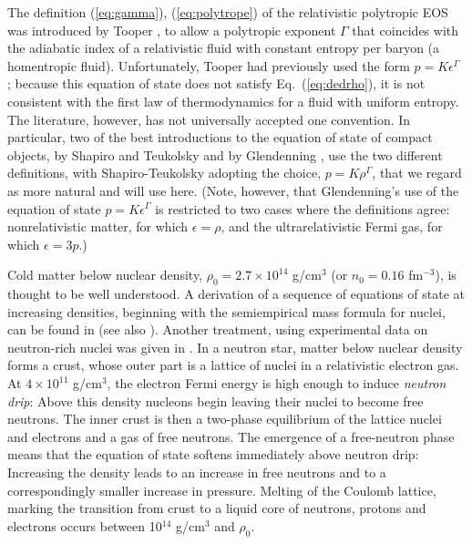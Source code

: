 \documentclass[12pt]{article}
\begin{document}
The definition (\ref{eq:gamma}), (\ref{eq:polytrope}) of the 
relativistic polytropic EOS was introduced by 
Tooper \cite{T65}, to allow a polytropic exponent $\Gamma$
that coincides with the adiabatic index of a relativistic fluid 
with constant entropy per baryon (a homentropic fluid).  
Unfortunately,
Tooper had previously used the form $p=K\epsilon^\Gamma$ \cite{Tooper64}; 
because this equation of state does not satisfy Eq.~(\ref{eq:dedrho}), 
it is not consistent with the first law of 
thermodynamics for a fluid with uniform entropy.  
The literature, however, has not universally accepted one convention.  In 
particular, two of the best introductions to the equation 
of state of compact objects, by Shapiro and Teukolsky \cite{ST83} and 
by Glendenning \cite{Glendenning97}, use the two different definitions, 
with Shapiro-Teukolsky adopting the choice, $p=K\rho^\Gamma$, that we regard 
as more natural and will use here. (Note, however, that Glendenning's  
use of the equation of state $p=K\epsilon^\Gamma$ is 
restricted to two cases where the definitions agree: nonrelativistic matter,
for which $\epsilon=\rho$, and the ultrarelativistic Fermi gas, 
for which $\epsilon = 3p$.)   
    
\vskip0.8cm

Cold matter below nuclear density, $\rho_0 = 2.7\times10^{14}$ g/cm$^3$ 
(or $n_0 = 0.16$ fm$^{-3}$), is
thought to be well understood. A derivation of a sequence of equations
of state at increasing densities, beginning with the semiempirical mass
formula for nuclei, can be found in \cite{ST83} (see also \cite{HaenselBook2007}).
Another treatment, using experimental data on neutron-rich nuclei was
given in \cite{HP94}.
In a neutron star, matter below nuclear density forms a crust, whose
outer part is a lattice of nuclei in a relativistic electron gas.  At
$4\times 10^{11}$ g/cm$^3$, the electron Fermi energy is high enough to
induce {\em neutron drip}: Above this density nucleons begin leaving
their nuclei to become free neutrons. The inner crust is then a
two-phase equilibrium of the lattice nuclei and electrons and a gas of
free neutrons.  The emergence of a free-neutron phase means that the
equation of state softens immediately above neutron drip:  Increasing
the density leads to an increase in free neutrons and to a
correspondingly smaller increase in pressure.  Melting of the Coulomb
lattice, marking the transition from crust to a liquid core of
neutrons, protons and electrons occurs between 10$^{14}$ g/cm$^3$ and
$\rho_0$.
\end{document}
